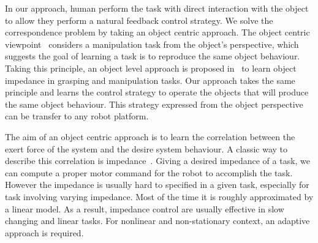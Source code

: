 In our approach, human perform the task with direct interaction with the object to allow they perform a natural feedback control strategy. We solve the correspondence problem by taking an object centric approach. The object centric viewpoint~\cite{okamura2000overview} considers a manipulation task from the object's perspective, which suggests the goal of learning a task is to reproduce the same object behaviour. Taking this principle, an object level approach is proposed in~\cite{Miao2014} to learn object impedance in grasping and manipulation tasks. Our approach takes the same principle and learns the control strategy to operate the objects that will produce the same object behaviour. This strategy expressed from the object perspective can be transfer to any robot platform. 

The aim of an object centric approach is to learn the correlation between the exert force of the system and the desire system behaviour. A classic way to describe this correlation is impedance~\cite{howard2010transferring}. Giving a desired impedance of a task, we can compute a proper motor command for the robot to accomplish the task. However the impedance is usually hard to specified in a given task, especially for task involving varying impedance. Most of the time it is roughly approximated by a linear model. As a result, impedance control are usually effective in slow changing and linear tasks. For nonlinear and non-stationary context, an adaptive approach is required.


%

